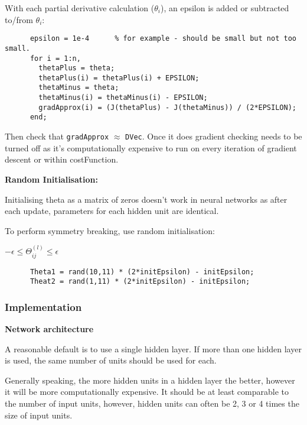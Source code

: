 \documentclass[12pt, a4paper]{article}
\begin{document}
{      With each partial derivative calculation ($\theta_i$), an epsilon is
      added or subtracted to/from $\theta_i$:

      \begin{lstlisting}
      epsilon = 1e-4      % for example - should be small but not too small.
      for i = 1:n,
        thetaPlus = theta;
        thetaPlus(i) = thetaPlus(i) + EPSILON;
        thetaMinus = theta;
        thetaMinus(i) = thetaMinus(i) - EPSILON;
        gradApprox(i) = (J(thetaPlus) - J(thetaMinus)) / (2*EPSILON);
      end;
      \end{lstlisting}

      Then check that \texttt{gradApprox} $\approx$ \texttt{DVec}. Once it does
      gradient checking needs to be turned off as it's computationally
      expensive to run on every iteration of gradient descent or within 
      costFunction.

      \textbf{Random Initialisation:}

      Initialising theta as a matrix of zeros doesn't work in neural networks
      as after each update, parameters for each hidden unit are identical.

      To perform symmetry breaking, use random initialisation:

      $-\epsilon \leq \Theta_{ij}^{(l)} \leq \epsilon$

      \begin{lstlisting}
      Theta1 = rand(10,11) * (2*initEpsilon) - initEpsilon;
      Theat2 = rand(1,11) * (2*initEpsilon) - initEpsilon;
      \end{lstlisting}

    \subsubsection{Implementation}

      \textbf{Network architecture}

      A reasonable default is to use a single hidden layer. If more than one 
      hidden layer is used, the same number of units should be used for each.
      
      Generally speaking, the more hidden units in a hidden layer the better,
      however it will be more computationally expensive. It should be at least
      comparable to the number of input units, however, hidden units can often
      be 2, 3 or 4 times the size of input units. 

}
\end{document}
